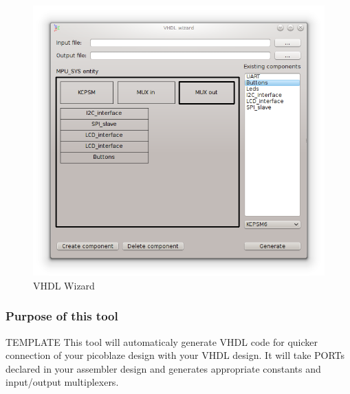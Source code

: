 \begin{figure}[h]
    \centering
    \includegraphics[width=.5\textwidth]{img/VHDL_wizard.png}
    \caption{VHDL Wizard}
\end{figure}

\subsubsection{Purpose of this tool}
    TEMPLATE
    This tool will automaticaly generate VHDL code for quicker connection of your picoblaze design with your VHDL design. It will take
    PORTs declared in your assembler design and generates appropriate constants and input/output multiplexers.

